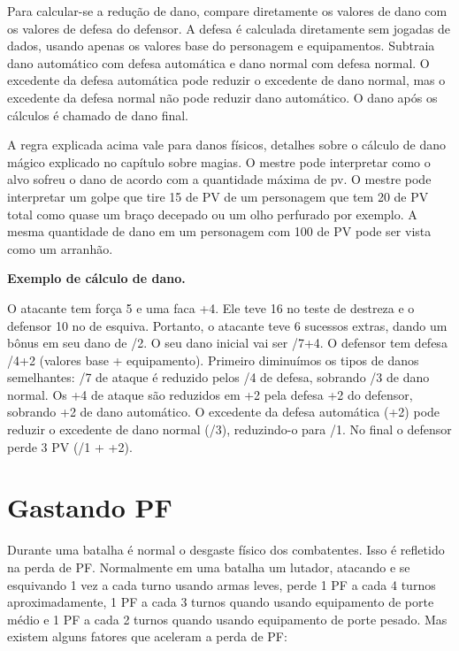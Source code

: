 Para calcular-se a redução de dano, compare diretamente os valores de dano com os valores de defesa do defensor. A defesa é calculada diretamente sem jogadas de dados, usando apenas os valores base do personagem e equipamentos. Subtraia dano automático com defesa automática e dano normal com defesa normal. O excedente da defesa automática pode reduzir o excedente de dano normal, mas o excedente da defesa normal não pode reduzir dano automático. O dano após os cálculos é chamado de dano final.

A regra explicada acima vale para danos físicos, detalhes sobre o cálculo de dano mágico explicado no capítulo sobre magias.
	O mestre pode interpretar como o alvo sofreu o dano de acordo com a quantidade máxima de pv. O mestre pode interpretar um golpe que tire 15 de PV de um personagem que tem 20 de PV total como quase um braço decepado ou um olho perfurado por exemplo. A mesma quantidade de dano em um personagem com 100 de PV pode ser vista como um arranhão.
	
\textbf{Exemplo de cálculo de dano.}

O atacante tem força 5 e uma faca +4. Ele teve 16 no teste de destreza e o defensor 10 no de esquiva. Portanto, o atacante teve 6 sucessos extras, dando um bônus em seu dano de /2. O seu dano inicial vai ser /7+4. O defensor tem defesa /4+2 (valores base + equipamento). Primeiro diminuímos os tipos de danos semelhantes: /7 de ataque é reduzido pelos /4 de defesa, sobrando /3 de dano normal. Os +4 de ataque são reduzidos em +2 pela defesa +2 do defensor, sobrando +2 de dano automático. O excedente da defesa automática (+2) pode reduzir o excedente de dano normal (/3), reduzindo-o para /1. No final o defensor perde 3 PV (/1 + +2).


\section{Gastando PF}

Durante uma batalha é normal o desgaste físico dos combatentes. Isso é refletido na perda de PF. Normalmente em uma batalha um lutador, atacando e se esquivando 1 vez a cada turno usando armas leves, perde 1 PF a cada 4 turnos aproximadamente, 1 PF a cada 3 turnos quando usando equipamento de porte médio e 1 PF a cada 2 turnos quando usando equipamento de porte pesado. Mas existem alguns fatores que aceleram a perda de PF:

